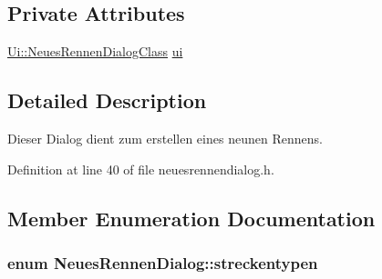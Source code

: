 \subsection*{Private Attributes}
\begin{CompactItemize}
\item 
\hyperlink{class_ui_1_1_neues_rennen_dialog_class}{Ui::NeuesRennenDialogClass} \hyperlink{class_neues_rennen_dialog_d9ee714059009671b3aaf7a94c7d53e2}{ui}
\end{CompactItemize}


\subsection{Detailed Description}
Dieser Dialog dient zum erstellen eines neunen Rennens. 

Definition at line 40 of file neuesrennendialog.h.

\subsection{Member Enumeration Documentation}
\hypertarget{class_neues_rennen_dialog_f7558683e85faf5b234c40264b3eb40c}{
\subsubsection[streckentypen]{\setlength{\rightskip}{0pt plus 5cm}enum {\bf NeuesRennenDialog::streckentypen}}}
\label{class_neues_rennen_dialog_f7558683e85faf5b234c40264b3eb40c}



